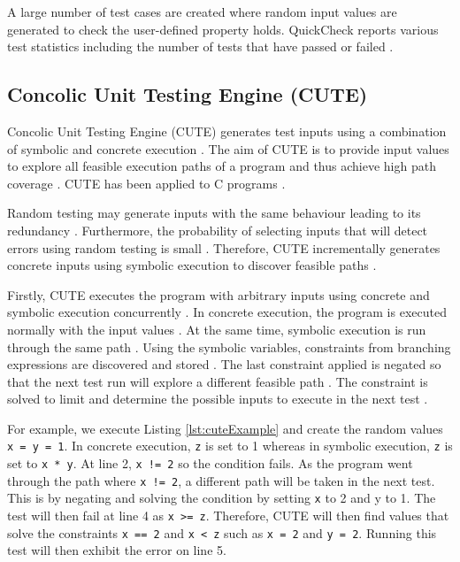 A large number of test cases are created where random input values are generated to check the user-defined property holds. QuickCheck reports various test statistics including the number of tests that have passed or failed \cite{QClightweight}.

\subsection{Concolic Unit Testing Engine (CUTE)}
Concolic Unit Testing Engine (CUTE) generates test inputs using a combination of symbolic and concrete execution \cite{CUTE}. 
The aim of CUTE is to provide input values to explore all feasible execution paths of a program and thus achieve high path coverage \cite{CUTE}. CUTE has been applied to C programs \cite{CUTE}.

Random testing may generate inputs with the same behaviour leading to its redundancy \cite{CUTE}. Furthermore, the probability of selecting inputs that will detect errors using random testing is small \cite{CUTE}. 
Therefore, CUTE incrementally generates concrete inputs using symbolic execution to discover feasible paths \cite{CUTE}.

Firstly, CUTE executes the program with arbitrary inputs using concrete and symbolic execution concurrently \cite{CUTE}.
In concrete execution, the program is executed normally with the input values \cite{CUTE}.
At the same time, symbolic execution is run through the same path  \cite{CUTE}. 
Using the symbolic variables, constraints from branching expressions are discovered and stored \cite{CUTE}.
The last constraint applied is negated so that the next test run will explore a different feasible path \cite{CUTE}. 
The constraint is solved to limit and determine the possible inputs to execute in the next test \cite{CUTE}.

For example, we execute Listing \ref{lst:cuteExample} and create the random values \texttt{x = y = 1}. 
In concrete execution, \texttt{z} is set to 1 whereas in symbolic execution, \texttt{z} is set to \texttt{x * y}.
At line 2, \texttt{x != 2} so the condition fails. 
As the program went through the path where \texttt{x != 2}, a different path will be taken in the next test. This is by negating and solving the condition by setting \texttt{x} to 2 and y to 1. 
The test will then fail at line 4 as \texttt{x >= z}. Therefore, CUTE will then find values that solve the constraints \texttt{x == 2} and \texttt{x < z} such as \texttt{x = 2} and \texttt{y = 2}. 
Running this test will then exhibit the error on line 5. 


